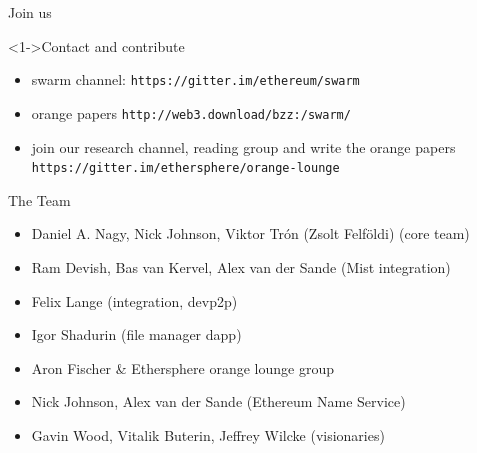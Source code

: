 \documentclass{beamer}
\begin{document}
\begin{frame}[plain]{Join us}

\begin{block}<1->{Contact and contribute}
\begin{itemize}
\item swarm channel: \texttt{https://gitter.im/ethereum/swarm}
\item orange papers \texttt{http://web3.download/bzz:/swarm/}
\item join our research channel, reading group and write the orange papers \texttt{https://gitter.im/ethersphere/orange-lounge}
\end{itemize}
\end{block}
\begin{block}{The Team}
\begin{itemize}
\footnotesize
\item Daniel A. Nagy, Nick Johnson, Viktor Trón (Zsolt Felföldi) (core team)
\item Ram Devish, Bas van Kervel, Alex van der Sande (Mist integration)
\item Felix Lange (integration, devp2p)
\item Igor Shadurin (file manager dapp)
\item Aron Fischer \& Ethersphere orange lounge group
\item Nick Johnson, Alex van der Sande (Ethereum Name Service)
\item Gavin Wood, Vitalik Buterin, Jeffrey Wilcke (visionaries)
\end{itemize}
\end{block}

\end{frame}
\end{document}
